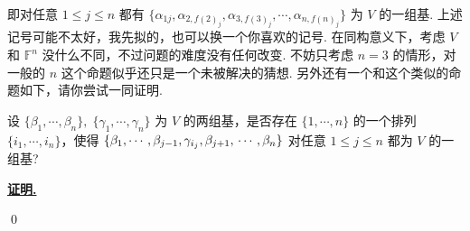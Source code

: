 \documentclass{ctexart}
\renewenvironment{proof}[1][证明]{\par\underline{\textbf{#1.}} \;\fangsong}{\qed\par}
\begin{document}
\begin{enumerate}[1.]
即对任意 \( 1 \leq j \leq n \) 都有 \( \{\alpha_{1j},\alpha_{2,f(2)_j}, \alpha_{3,f(3)_j},\cdots,\alpha_{n,f(n)_j}\} \) 为 \( V \) 的一组基. 上述记号可能不太好，我先拟的，也可以换一个你喜欢的记号. 在同构意义下，考虑 \( V \) 和 \( \mathbb{F}^n \) 没什么不同，不过问题的难度没有任何改变. 不妨只考虑 \( n=3 \) 的情形，对一般的 \( n \) 这个命题似乎还只是一个未被解决的猜想. 另外还有一个和这个类似的命题如下，请你尝试一同证明.

设 \( \{\beta_1,\cdots,\beta_n \}, \; \{\gamma_1,\cdots,\gamma_n \}\) 为 \( V \) 的两组基，是否存在 \( \{1,\cdots,n\} \) 的一个排列 \( \{ i_1,\cdots,i_n\} \)，使得 \( \{\beta_1,\cdots,\beta_{j-1},\gamma_{i_j},\beta_{j+1}, \\ \cdots,\beta_n\} \) 对任意 \( 1 \leq j \leq n \) 都为 \( V \) 的一组基?


\begin{proof}
	
\end{proof}

\end{enumerate}
\end{document}
